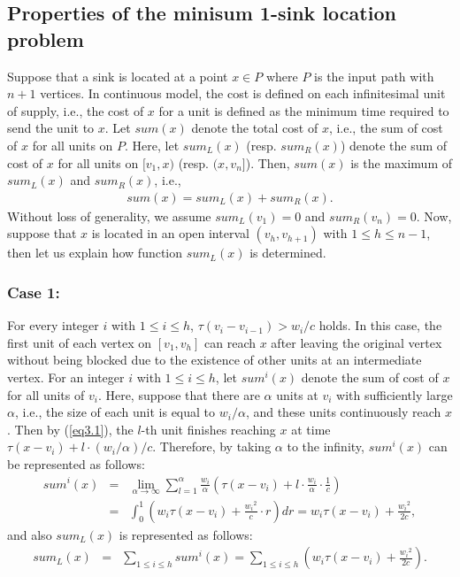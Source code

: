 \documentclass[a4paper]{llncs}
\begin{document}
\subsection{Properties of the minisum 1-sink location problem}
\label{sec:minisum1}
Suppose that a sink is located at a point $x \in P$ where $P$ is the input path with $n+1$ vertices.
In continuous model, the cost is defined on each infinitesimal unit of supply,
i.e., the cost of $x$ for a unit is defined as the minimum time required to send the unit to $x$.
Let $sum(x)$ denote the total cost of $x$, i.e., the sum of cost of $x$ for all units on $P$.
Here, let $sum_L(x)$ (resp. $sum_R(x)$) denote the sum of cost of $x$ for all units on $[v_1, x)$ (resp. $(x, v_n]$).
Then, $sum(x)$ is the maximum of $sum_L(x)$ and $sum_R(x)$, i.e., 
\begin{eqnarray}
sum(x) = sum_L(x) + sum_R(x). \label{eq:ms1}
\end{eqnarray}
Without loss of generality, we assume $sum_L(v_1) = 0$ and $sum_R(v_n) = 0$.
Now, suppose that $x$ is located in an open interval $(v_h, v_{h+1})$ with $1 \le h \le n-1$,
then let us explain how function $sum_L(x)$ is determined.

\subsubsection{Case 1:}
For every integer $i$ with $1 \le i \le h$, $\tau(v_i-v_{i-1}) > w_i/c$ holds.
In this case, the first unit of each vertex on $[v_1, v_h]$ can reach $x$ after leaving the original vertex 
without being blocked due to the existence of other units at an intermediate vertex. 
For an integer $i$ with $1 \le i \le h$, let $sum^i(x)$ denote the sum of cost of $x$ for all units of $v_i$.
Here, suppose that there are $\alpha$ units at $v_i$ with sufficiently large $\alpha$, i.e., the size of each unit is equal to $w_i/\alpha$,
and these units continuously reach $x$.
Then by (\ref{eq3.1}), the $l$-th unit finishes reaching $x$ at time $\tau(x-v_i) + l \cdot (w_i/\alpha)/c$.
Therefore, by taking $\alpha$ to the infinity, $sum^i(x)$ can be represented as follows:
\begin{eqnarray}
sum^i(x)  	&=& \lim_{\alpha \to \infty} \sum_{l=1}^\alpha \frac{w_i}{\alpha}\left( \tau(x-v_i) + l \cdot \frac{w_i}{\alpha} \cdot \frac{1}{c} \right) \nonumber \\ 
			&=& \int_0^1 \left( w_i\tau(x-v_i) + \frac{{w_i}^2}{c} \cdot r \right) dr = w_i\tau(x-v_i) + \frac{{w_i}^2}{2c},
\end{eqnarray}
and also $sum_L(x)$ is represented as follows:
\begin{eqnarray}
sum_L(x)  	&=& \sum_{1 \le i \le h} sum^i(x) = \sum_{1 \le i \le h} \left( w_i\tau(x-v_i) + \frac{{w_i}^2}{2c} \right). \label{eq:ms2}
\end{eqnarray}
\end{document}
